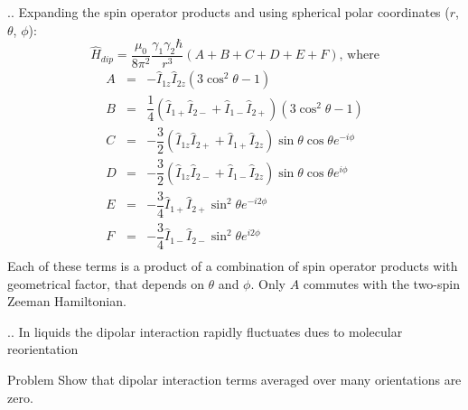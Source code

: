 \documentclass{beamer}
\begin{document}
\begin{frame}{\thesection.\thesubsection. \insertsubsection}
	Expanding the spin operator products and using spherical polar coordinates ($r$, $\theta$, $\phi$):
	\begin{equation}
	\hat{H}_{dip} = \dfrac{\mu_0}{8 \pi^2} \dfrac{\gamma_1 \gamma_2 \hbar}{r^3} (A+B+C+D+E+F)  \text{, where} 
	\end{equation}
	\begin{equation}
	\begin{array}{cll}
	   A &=& -\hat{I}_{1z} \hat{I}_{2z} (3 \cos^2 \theta - 1) \\
	   B &=& \dfrac{1}{4} ( \hat{I}_{1+} \hat{I}_{2-} + \hat{I}_{1-} \hat{I}_{2+}) (3 \cos^2 \theta - 1) \\
	   C &=& -\dfrac{3}{2} ( \hat{I}_{1z} \hat{I}_{2+} + \hat{I}_{1+} \hat{I}_{2z}) \sin \theta \cos \theta e^{-i\phi} \\
   	   D &=& -\dfrac{3}{2} ( \hat{I}_{1z} \hat{I}_{2-} + \hat{I}_{1-} \hat{I}_{2z}) \sin \theta \cos \theta e^{i\phi} \\
   	   E &=& -\dfrac{3}{4} \hat{I}_{1+} \hat{I}_{2+} \sin^2 \theta e^{-i 2 \phi} \\
   	   F &=& -\dfrac{3}{4} \hat{I}_{1-} \hat{I}_{2-} \sin^2 \theta e^{i 2 \phi} \\
	\end{array}
	\end{equation}
	Each of these terms is a product of a combination of spin operator products with geometrical factor, that depends on $\theta$ and $\phi$. Only $A$ commutes with the two-spin Zeeman Hamiltonian.
\end{frame}

\begin{frame}{\thesection.\thesubsection. \insertsubsection}
	In liquids the dipolar interaction rapidly fluctuates dues to molecular reorientation
	\begin{block}{Problem}
		Show that dipolar interaction terms averaged over many orientations are zero.
	\end{block}
\end{frame}
\end{document}
